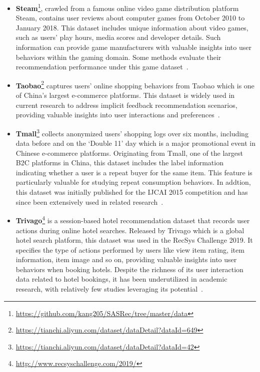 \documentclass[lettersize,journal]{IEEEtran}
\begin{document}
\begin{itemize}
    \item \textbf{Steam}\footnote{\url{https://github.com/kang205/SASRec/tree/master/data}}, crawled from a famous online video game distribution platform Steam, contains user reviews about computer games from October 2010 to January 2018. This dataset includes unique information about video games, such as users' play hours, media scores and developer details. Such information can provide game manufacturers with valuable insights into user behaviors within the gaming domain. Some methods evaluate their recommendation performance under this game dataset~\cite{Li@WSDM2020,Zheng@AAAI2021,Seol@SIGIR2022Short,Zhang@KDD2023}.

    \item \textbf{Taobao}\footnote{\url{https://tianchi.aliyun.com/dataset/dataDetail?dataId=649}} captures users' online shopping behaviors from Taobao which is one of China's largest e-commerce platforms. This dataset is widely used in current research to address implicit feedback recommendation scenarios, providing valuable insights into user interactions and preferences~\cite{yang@KDD2022,Zhu@NeurIPS2019,Han@WWW2024,WW@TKDE2023,yuan@SIGIR2022}.

    \item \textbf{Tmall}\footnote{\url{https://tianchi.aliyun.com/dataset/dataDetail?dataId=42}} collects anonymized users' shopping logs over six months, including data before and on the `Double 11' day which is a major promotional event in Chinese e-commerce platforms. Originating from Tmall, one of the largest B2C platforms in China, this dataset includes the label information indicating whether a user is a repeat buyer for the same item. This feature is particularly valuable for studying repeat consumption behaviors. In addtion, this dataset was initially published for the IJCAI 2015 competition and has since been extensively used in related research~\cite{Hou@SIGIR2022Short,Han@SIGIR2022,zhou@WWW2022,Qiao@CIKM2023}.

    \item \textbf{Trivago}\footnote{\url{http://www.recsyschallenge.com/2019/}} is a session-based hotel recommendation dataset that records user actions during online hotel searches. Released by Trivago which is a global hotel search platform, this dataset was used in the RecSys Challenge 2019. It specifies the type of actions performed by users like view item rating, item information, item image and so on, providing valuable insights into user behaviors when booking hotels. Despite the richness of its user interaction data related to hotel bookings, it has been underutilized in academic research, with relatively few studies leveraging its potential~\cite{Yuan@ICDE2022}.


\end{itemize}
\end{document}
